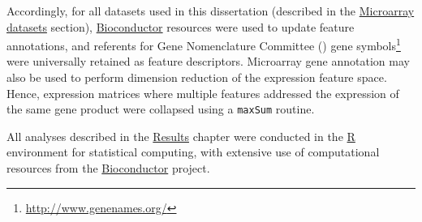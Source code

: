 Accordingly, for all datasets used in this dissertation (described in the
\hyperref[sec:methods-datasets]{\textsf{Microarray datasets}} section),
\href{http://www.bioconductor.org/}{\textsf{Bioconductor}} resources were used
to update feature annotations, and referents for  Gene
Nomenclature Committee () gene
symbols\footnote{\href{http://www.genenames.org/}{http://www.genenames.org/}}
were universally retained as feature descriptors.  Microarray gene annotation
may also be used to perform dimension reduction of the expression feature space.
Hence, expression matrices where multiple features addressed the expression of
the same gene product were collapsed using a \texttt{maxSum}
routine.\cite{miller_strategies_2011}

All analyses described in the \hyperref[chap:results]{\textsf{Results}} chapter
were conducted in the \href{http://www.r-project.org/}{\textsf{R}} environment
for statistical computing,\cite{r_core_team_r:_2014} with extensive use of
computational resources from the
\href{http://www.bioconductor.org/}{\textsf{Bioconductor}}
project.\cite{gentleman_bioconductor:_2004}





